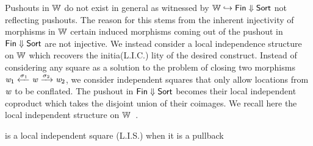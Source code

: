 Pushouts in $\mathbb{W}$ do not exist in general as witnessed by $\mathbb{W} \hookrightarrow {\mathsf{Fin}}\Downarrow{\mathsf{Sort}}$ not reflecting pushouts.
The reason for this stems from the inherent injectivity of morphisms in $\mathbb{W}$
certain induced morphisms coming out of the pushout in ${\mathsf{Fin}}\Downarrow{\mathsf{Sort}}$ are not injective.
We instead consider a local independence structure on $\mathbb{W}$ which recovers the initia(L.I.C.) lity of the desired construct.
Instead of considering any square as a solution to the problem of closing two morphisms $\mathit{w}_1 \xleftarrow{\sigma_1} \mathit{w} \xrightarrow{\sigma_2} \mathit{w}_2$,
we consider independent squares that only allow locations from $\mathit{w}$ to be conflated.
The pushout in ${\mathsf{Fin}}\Downarrow{\mathsf{Sort}}$ becomes their local independent coproduct which takes the disjoint union of their coimages.
We recall here the local independent structure on $\mathbb{W}$~\cite{simpson2018category}.

\begin{definition}
    is a local independent square (L.I.S.) when it is a pullback
    \begin{center}
    \end{center}
\end{definition}

